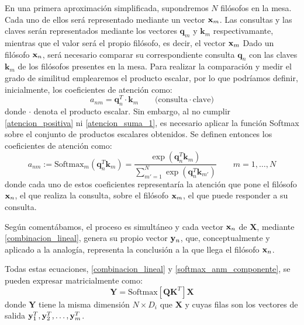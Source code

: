 En una primera aproximación simplificada, supondremos $N$ filósofos en la mesa.
Cada uno de ellos será representado mediante un vector $\mathbf{x}_m$.
Las consultas y las claves serán representados 
mediante los vectores $\mathbf{q}_m$ y $\mathbf{k}_m$  respectivamante, 
mientras que el valor
será el propio filósofo, es decir, el vector $\mathbf{x}_m $
Dado un filósofo $\mathbf{x}_n$, será necesario comparar su correspondiente consulta
$\mathbf{q}_n$ con las claves $\mathbf{k}_m$ de
los filósofos presentes en la mesa. Para realizar la comparación y medir el 
grado de similitud emplearemos el producto escalar, por lo que podríamos 
definir, inicialmente, los coeficientes de atención como:
\begin{equation}
    a_{nm} = \mathbf{q}_n^{{T}}  \cdot \mathbf{k}_m \qquad \text{(consulta} \cdot \text{clave)} 
\end{equation}
donde  $\cdot$ denota el producto escalar. 
Sin embargo, al no cumplir \eqref{atencion_positiva} ni 
\eqref{atencion_suma_1}, es necesario aplicar la función Softmax 
sobre el conjunto de productos escalares obtenidos. Se definen entonces los coeficientes de atención 
como:
\begin{equation}
    a_{nm} := \text{Softmax}_m(\mathbf{q}_n^{T} \mathbf{k}_m) = 
    \frac{\exp(\mathbf{q}_n^{T} \mathbf{k}_m)}{\sum_{m'=1}^{N} \exp(\mathbf{q}_n^{T} \mathbf{k}_{m'})} 
    \qquad  m = 1, \dots, N
    \label{softmax_anm_componente}
\end{equation}
donde cada uno de estos coeficientes representaría la atención que pone 
el filósofo $\mathbf{x}_n$, el  que realiza la consulta, sobre el filósofo $\mathbf{x}_m$, 
el que 
puede responder a su consulta.

Según comentábamos, el proceso es simultáneo y cada vector 
$\mathbf{x}_n$ de $\mathbf{X}$, mediante \eqref{combinacion_lineal}, genera su 
propio vector $\mathbf{y}_n$, que, conceptualmente y aplicado a la analogía,
representa la conclusión a la que llega el filósofo $\mathbf{x}_n$.

Todas estas ecuaciones, \eqref{combinacion_lineal} y 
\eqref{softmax_anm_componente}, se pueden expresar matricialmente como:
\begin{equation}
    \mathbf{Y} = \text{Softmax}[\mathbf{Q}  \mathbf{K}^T]\mathbf{X}
    \label{eq:softmax_anm_matriz}
\end{equation}
donde $\mathbf{Y}$ tiene la  misma dimensión $N\times D_i$ que $\mathbf{X}$ y 
cuyas filas son los vectores de salida $\mathbf{y}_1^T,\mathbf{y}_2^T,\dots,\mathbf{y}_m^T$.

